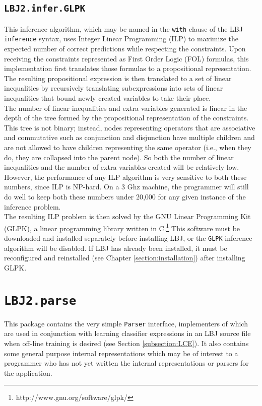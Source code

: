 \subsection{{\tt LBJ2.infer.GLPK}} \label{subsection:GLPK}

This inference algorithm, which may be named in the {\tt with} clause of the
LBJ {\tt inference} syntax, uses Integer Linear Programming (ILP) to maximize
the expected number of correct predictions while respecting the constraints.
Upon receiving the constraints represented as First Order Logic (FOL)
formulas, this implementation first translates those formulas to a
propositional representation.  The resulting propositional expression is then
translated to a set of linear inequalities by recursively translating
subexpressions into sets of linear inequalities that bound newly created
variables to take their place. \\

The number of linear inequalities and extra variables generated is linear in
the depth of the tree formed by the propositional representation of the
constraints.  This tree is not binary; instead, nodes representing operators
that are associative and commutative such as conjunction and disjunction have
multiple children and are not allowed to have children representing the same
operator (i.e., when they do, they are collapsed into the parent node).  So
both the number of linear inequalities and the number of extra variables
created will be relatively low.  However, the performance of any ILP algorithm
is very sensitive to both these numbers, since ILP is NP-hard.  On a 3 Ghz
machine, the programmer will still do well to keep both these numbers under
20,000 for any given instance of the inference problem. \\

The resulting ILP problem is then solved by the GNU Linear Programming Kit
(GLPK), a linear programming library written in
C.\footnote{http://www.gnu.org/software/glpk/}  This software must be
downloaded and installed separately before installing LBJ, or the {\tt GLPK}
inference algorithm will be disabled.  If LBJ has already been installed, it
must be reconfigured and reinstalled (see Chapter \ref{section:installation})
after installing GLPK.

\section{{\tt LBJ2.parse}}

This package contains the very simple {\tt Parser} interface, implementers of
which are used in conjunction with learning classifier expressions in an LBJ
source file when off-line training is desired (see Section
\ref{subsection:LCE}).  It also contains some general purpose internal
representations which may be of interest to a programmer who has not yet
written the internal representations or parsers for the application.

